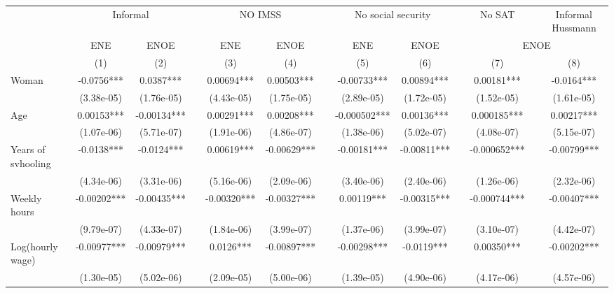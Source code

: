 \begin{tabular}{lcccccccccccc}
\toprule
      & \multicolumn{2}{c}{Informal} &       & \multicolumn{2}{c}{NO IMSS} &       & \multicolumn{2}{c}{No social security} &       & No SAT &       & Informal Hussmann \\
\cmidrule{2-3}\cmidrule{5-6}\cmidrule{8-9}\cmidrule{11-11}\cmidrule{13-13}      & ENE   & ENOE  &       & ENE   & ENOE  &       & ENE   & ENOE  &       & \multicolumn{3}{c}{ENOE} \\
\midrule
      & (1)   & (2)   &       & (3)   & (4)   &       & (5)   & (6)   &       & (7)   &       & (8) \\
\midrule
\midrule
Woman & -0.0756*** & 0.0387*** &       & 0.00694*** & 0.00503*** &       & -0.00733*** & 0.00894*** &       & 0.00181*** &       & -0.0164*** \\
      & (3.38e-05) & (1.76e-05) &       & (4.43e-05) & (1.75e-05) &       & (2.89e-05) & (1.72e-05) &       & (1.52e-05) &       & (1.61e-05) \\
Age   & 0.00153*** & -0.00134*** &       & 0.00291*** & 0.00208*** &       & -0.000502*** & 0.00136*** &       & 0.000185*** &       & 0.00217*** \\
      & (1.07e-06) & (5.71e-07) &       & (1.91e-06) & (4.86e-07) &       & (1.38e-06) & (5.02e-07) &       & (4.08e-07) &       & (5.15e-07) \\
Years of svhooling & -0.0138*** & -0.0124*** &       & 0.00619*** & -0.00629*** &       & -0.00181*** & -0.00811*** &       & -0.000652*** &       & -0.00799*** \\
      & (4.34e-06) & (3.31e-06) &       & (5.16e-06) & (2.09e-06) &       & (3.40e-06) & (2.40e-06) &       & (1.26e-06) &       & (2.32e-06) \\
Weekly hours & -0.00202*** & -0.00435*** &       & -0.00320*** & -0.00327*** &       & 0.00119*** & -0.00315*** &       & -0.000744*** &       & -0.00407*** \\
      & (9.79e-07) & (4.33e-07) &       & (1.84e-06) & (3.99e-07) &       & (1.37e-06) & (3.99e-07) &       & (3.10e-07) &       & (4.42e-07) \\
Log(hourly wage) & -0.00977*** & -0.00979*** &       & 0.0126*** & -0.00897*** &       & -0.00298*** & -0.0119*** &       & 0.00350*** &       & -0.00202*** \\
      & (1.30e-05) & (5.02e-06) &       & (2.09e-05) & (5.00e-06) &       & (1.39e-05) & (4.90e-06) &       & (4.17e-06) &       & (4.57e-06) \\

\end{tabular}
